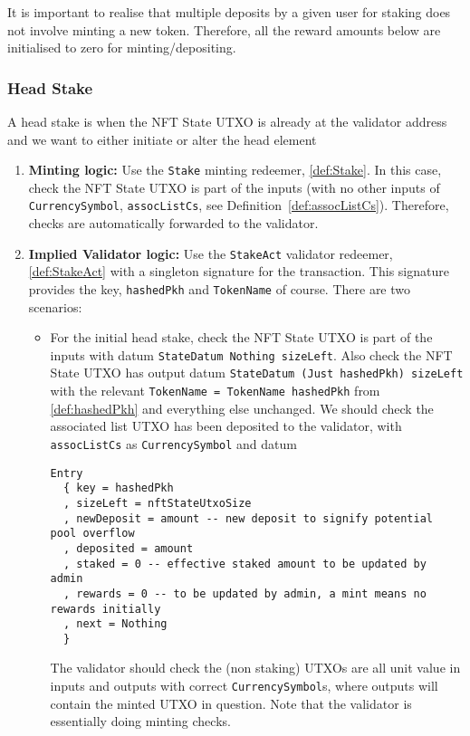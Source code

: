 \documentclass[10pt, a4paper]{article}
\theoremstyle{definition}
\begin{document}
It is important to realise that multiple deposits by a given user for staking does not involve minting a new token. Therefore, all the reward amounts below are initialised to zero for minting/depositing.

\subsubsection{Head Stake}\label{subsubsection:HeadStake}
A head stake is when the NFT State UTXO is already at the validator address and we want to either initiate or alter the head element
\begin{enumerate}
\item{\textbf{Minting logic:} Use the \texttt{Stake} minting redeemer, \ref{def:Stake}. In this case, check the NFT State UTXO is part of the inputs (with no other inputs of \texttt{CurrencySymbol}, \texttt{assocListCs}, see Definition~\ref{def:assocListCs}). Therefore, checks are automatically forwarded to the validator.}
\item{\textbf{Implied Validator logic:} Use the \texttt{StakeAct} validator redeemer, \ref{def:StakeAct} with a singleton signature for the transaction. This signature provides the key, \texttt{hashedPkh} and \texttt{TokenName} of course. There are two scenarios:

\begin{itemize}
\item{For the initial head stake, check the NFT State UTXO is part of the inputs with datum \texttt{StateDatum Nothing sizeLeft}. Also check the NFT State UTXO has output datum \texttt{StateDatum (Just hashedPkh) sizeLeft} with the relevant \texttt{TokenName = TokenName hashedPkh} from \ref{def:hashedPkh} and everything else unchanged. We should check the associated list UTXO has been deposited to the validator, with \texttt{assocListCs} as \texttt{CurrencySymbol} and datum
\begin{verbatim}
Entry
  { key = hashedPkh
  , sizeLeft = nftStateUtxoSize
  , newDeposit = amount -- new deposit to signify potential pool overflow
  , deposited = amount
  , staked = 0 -- effective staked amount to be updated by admin
  , rewards = 0 -- to be updated by admin, a mint means no rewards initially
  , next = Nothing
  }
\end{verbatim}
The validator should check the (non staking) UTXOs are all unit value in inputs and outputs with correct \texttt{CurrencySymbol}s, where outputs will contain the minted UTXO in question. Note that the validator is essentially doing minting checks.

}
\end{itemize}}
\end{enumerate}
\end{document}
